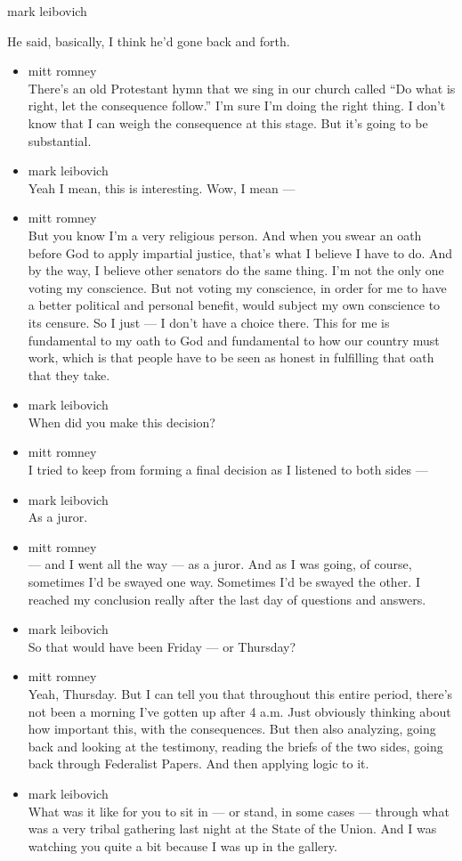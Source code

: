 mark leibovich

He said, basically, I think he'd gone back and forth.

\begin{itemize}
\item
  mitt romney\\
  There's an old Protestant hymn that we sing in our church called ``Do
  what is right, let the consequence follow.'' I'm sure I'm doing the
  right thing. I don't know that I can weigh the consequence at this
  stage. But it's going to be substantial.
\item
  mark leibovich\\
  Yeah I mean, this is interesting. Wow, I mean ---
\item
  mitt romney\\
  But you know I'm a very religious person. And when you swear an oath
  before God to apply impartial justice, that's what I believe I have to
  do. And by the way, I believe other senators do the same thing. I'm
  not the only one voting my conscience. But not voting my conscience,
  in order for me to have a better political and personal benefit, would
  subject my own conscience to its censure. So I just --- I don't have a
  choice there. This for me is fundamental to my oath to God and
  fundamental to how our country must work, which is that people have to
  be seen as honest in fulfilling that oath that they take.
\item
  mark leibovich\\
  When did you make this decision?
\item
  mitt romney\\
  I tried to keep from forming a final decision as I listened to both
  sides ---
\item
  mark leibovich\\
  As a juror.
\item
  mitt romney\\
  --- and I went all the way --- as a juror. And as I was going, of
  course, sometimes I'd be swayed one way. Sometimes I'd be swayed the
  other. I reached my conclusion really after the last day of questions
  and answers.
\item
  mark leibovich\\
  So that would have been Friday --- or Thursday?
\item
  mitt romney\\
  Yeah, Thursday. But I can tell you that throughout this entire period,
  there's not been a morning I've gotten up after 4 a.m. Just obviously
  thinking about how important this, with the consequences. But then
  also analyzing, going back and looking at the testimony, reading the
  briefs of the two sides, going back through Federalist Papers. And
  then applying logic to it.
\item
  mark leibovich\\
  What was it like for you to sit in --- or stand, in some cases ---
  through what was a very tribal gathering last night at the State of
  the Union. And I was watching you quite a bit because I was up in the
  gallery.


\end{itemize}
